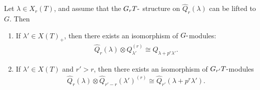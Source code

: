 \begin{proposition}[?]

Let \(\lambda\in X_r(T)\), and assume that the \(G_r T{\hbox{-}}\)
structure on \(\widehat{Q}_r(\lambda)\) can be lifted to \(G\). Then

\begin{enumerate}
\def\labelenumi{\alph{enumi}.}
\item
  If \(\lambda'\in X(T)_+\), then there exists an isomorphism of
  \(G{\hbox{-}}\)modules:
  \begin{align*}  
  \widehat{Q}_r(\lambda) \otimes Q_{\lambda'}^{(r)} \cong Q_{\lambda + p^r \lambda'}
  .\end{align*}
\item
  If \(\lambda'\in X(T)\) and \(r'>r\), then there exists an isomorphism
  of \(G_{r'} T{\hbox{-}}\)modules
  \begin{align*}  
  \widehat{Q}_r(\lambda) \otimes\widehat{Q}_{r' - r}(\lambda')^{(r)} \cong \widehat{Q}_{r'}(\lambda + p^r \lambda')
  .\end{align*}
\end{enumerate}

\end{proposition}


